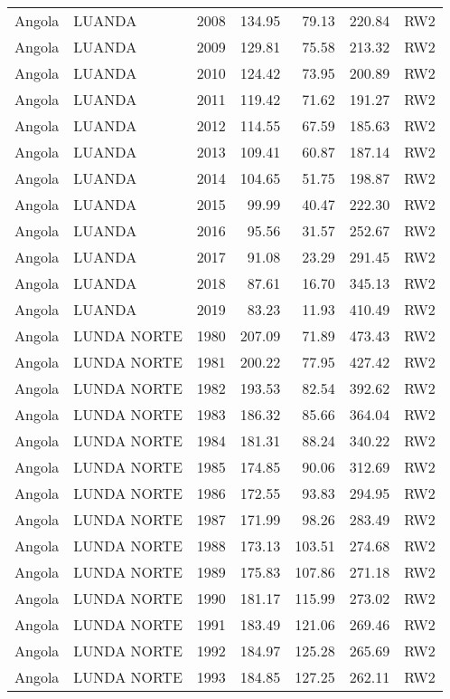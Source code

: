 \begin{longtable}{lllrrrl}
  Angola & LUANDA & 2008 & 134.95 & 79.13 & 220.84 & RW2 \\ 
  Angola & LUANDA & 2009 & 129.81 & 75.58 & 213.32 & RW2 \\ 
  Angola & LUANDA & 2010 & 124.42 & 73.95 & 200.89 & RW2 \\ 
  Angola & LUANDA & 2011 & 119.42 & 71.62 & 191.27 & RW2 \\ 
  Angola & LUANDA & 2012 & 114.55 & 67.59 & 185.63 & RW2 \\ 
  Angola & LUANDA & 2013 & 109.41 & 60.87 & 187.14 & RW2 \\ 
  Angola & LUANDA & 2014 & 104.65 & 51.75 & 198.87 & RW2 \\ 
  Angola & LUANDA & 2015 & 99.99 & 40.47 & 222.30 & RW2 \\ 
  Angola & LUANDA & 2016 & 95.56 & 31.57 & 252.67 & RW2 \\ 
  Angola & LUANDA & 2017 & 91.08 & 23.29 & 291.45 & RW2 \\ 
  Angola & LUANDA & 2018 & 87.61 & 16.70 & 345.13 & RW2 \\ 
  Angola & LUANDA & 2019 & 83.23 & 11.93 & 410.49 & RW2 \\ 
  Angola & LUNDA NORTE & 1980 & 207.09 & 71.89 & 473.43 & RW2 \\ 
  Angola & LUNDA NORTE & 1981 & 200.22 & 77.95 & 427.42 & RW2 \\ 
  Angola & LUNDA NORTE & 1982 & 193.53 & 82.54 & 392.62 & RW2 \\ 
  Angola & LUNDA NORTE & 1983 & 186.32 & 85.66 & 364.04 & RW2 \\ 
  Angola & LUNDA NORTE & 1984 & 181.31 & 88.24 & 340.22 & RW2 \\ 
  Angola & LUNDA NORTE & 1985 & 174.85 & 90.06 & 312.69 & RW2 \\ 
  Angola & LUNDA NORTE & 1986 & 172.55 & 93.83 & 294.95 & RW2 \\ 
  Angola & LUNDA NORTE & 1987 & 171.99 & 98.26 & 283.49 & RW2 \\ 
  Angola & LUNDA NORTE & 1988 & 173.13 & 103.51 & 274.68 & RW2 \\ 
  Angola & LUNDA NORTE & 1989 & 175.83 & 107.86 & 271.18 & RW2 \\ 
  Angola & LUNDA NORTE & 1990 & 181.17 & 115.99 & 273.02 & RW2 \\ 
  Angola & LUNDA NORTE & 1991 & 183.49 & 121.06 & 269.46 & RW2 \\ 
  Angola & LUNDA NORTE & 1992 & 184.97 & 125.28 & 265.69 & RW2 \\ 
  Angola & LUNDA NORTE & 1993 & 184.85 & 127.25 & 262.11 & RW2 \\ 

\end{longtable}

